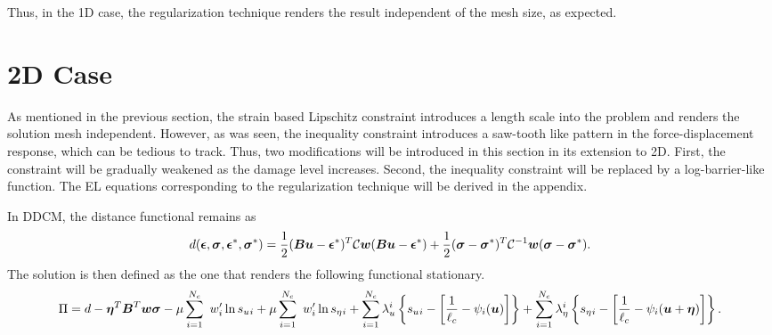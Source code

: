 \documentclass[11pt]{elsarticle}
\begin{document}
Thus, in the 1D case, the regularization technique renders the result independent of the mesh size, as expected.

\section{2D Case}

As mentioned in the previous section, the strain based Lipschitz constraint introduces a length scale into the problem and renders the solution mesh independent. However, as was seen, the inequality constraint introduces a saw-tooth like pattern in the force-displacement response, which can be tedious to track. Thus, two modifications will be introduced in this section in its extension to 2D. First, the constraint will be gradually weakened as the damage level increases. Second, the inequality constraint will be replaced by a log-barrier-like function. The EL equations corresponding to the regularization technique will be derived in the appendix.

In DDCM, the distance functional remains as
\begin{equation}
	d(\mbox{\boldmath $\epsilon$},\mbox{\boldmath $\sigma$},\mbox{\boldmath $\epsilon$}^*,\mbox{\boldmath $\sigma$}^*) = \frac{1}{2}(\mbox{\boldmath $B$} \mbox{\boldmath $u$} - \mbox{\boldmath $\epsilon$}^*)^T\mathcal{C}\mbox{\boldmath $w$}(\mbox{\boldmath $B$} \mbox{\boldmath $u$} - \mbox{\boldmath $\epsilon$}^*) + \frac{1}{2}(\mbox{\boldmath $\sigma$} - \mbox{\boldmath $\sigma$}^*)^T\mathcal{C}^{-1}\mbox{\boldmath $w$}(\mbox{\boldmath $\sigma$} - \mbox{\boldmath $\sigma$}^*).
\end{equation}
The solution is then defined as the one that renders the following functional stationary.
\begin{equation}
	\Pi  = d -\mbox{\boldmath $\eta$} ^T \mbox{\boldmath $B$}^T \mbox{\boldmath $w$} \mbox{\boldmath $\sigma$} - \mu \sum_{i=1}^{N_c} \
	w_i' \ln s_u{_i} + \mu \sum_{i=1}^{N_c} \
	w_i' \ln s_\eta{_i} +\sum_{i=1}^{N_c} \lambda_u^ i \left\{ s_u{_i}  - \left[ \frac{1}{\ell_c}- \psi_i(\mbox{\boldmath $u$}) \right]  \right\} 
	+\sum_{i=1}^{N_c} \lambda_\eta^ i \left\{ s_\eta{_i}  - \left[ \frac{1}{\ell_c}- \psi_i(\mbox{\boldmath $u$}+\mbox{\boldmath $\eta$}) \right]  \right\}.
\end{equation}
\end{document}
